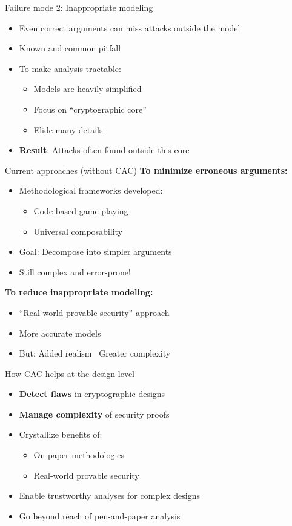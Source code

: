 \documentclass[aspectratio=169, lualatex, handout]{beamer}
\begin{document}
\begin{frame}{Failure mode 2: Inappropriate modeling}
	\begin{itemize}
		\item Even correct arguments can miss attacks outside the model
		\item Known and common pitfall
		\item To make analysis tractable:
		      \begin{itemize}
			      \item Models are heavily simplified
			      \item Focus on ``cryptographic core''
			      \item Elide many details
		      \end{itemize}
		\item \textbf{Result}: Attacks often found outside this core
	\end{itemize}
\end{frame}

\begin{frame}{Current approaches (without CAC)}
	\textbf{To minimize erroneous arguments:}
	\begin{itemize}
		\item Methodological frameworks developed:
		      \begin{itemize}
			      \item Code-based game playing
			      \item Universal composability
		      \end{itemize}
		\item Goal: Decompose into simpler arguments
		\item Still complex and error-prone!
	\end{itemize}
	\vspace{0.5em}
	\textbf{To reduce inappropriate modeling:}
	\begin{itemize}
		\item ``Real-world provable security'' approach
		\item More accurate models
		\item But: Added realism \rightarrow\ Greater complexity
	\end{itemize}
\end{frame}

\begin{frame}{How CAC helps at the design level}
	\begin{itemize}
		\item \textbf{Detect flaws} in cryptographic designs
		\item \textbf{Manage complexity} of security proofs
		\item Crystallize benefits of:
		      \begin{itemize}
			      \item On-paper methodologies
			      \item Real-world provable security
		      \end{itemize}
		\item Enable trustworthy analyses for complex designs
		\item Go beyond reach of pen-and-paper analysis
	\end{itemize}
\end{frame}
\end{document}
